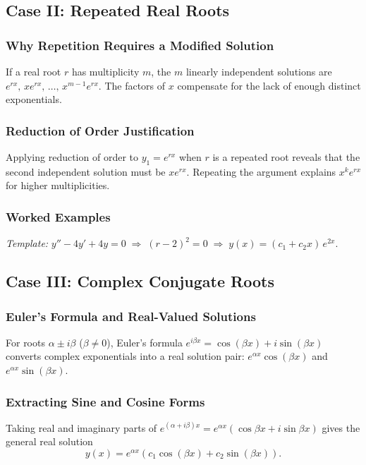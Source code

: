 \documentclass[10pt]{article}
\newcommand{\m}[1]{$#1$}
\newcommand{\annotspace}[1][3.5cm]{\vspace{#1}}
\begin{document}
    \annotspace[5cm]

\subsection{Case II: Repeated Real Roots}

    \subsubsection{Why Repetition Requires a Modified Solution}
    If a real root \m{r} has multiplicity \m{m}, the \m{m} linearly independent solutions are
    \m{e^{rx},\, x e^{rx},\, \ldots,\, x^{m-1} e^{rx}}.
    The factors of \m{x} compensate for the lack of enough distinct exponentials.

    \subsubsection{Reduction of Order Justification}
    Applying reduction of order to \m{y_1 = e^{rx}} when \m{r} is a repeated root reveals that the
    second independent solution must be \m{x e^{rx}}. Repeating the argument explains \m{x^k e^{rx}}
    for higher multiplicities.

    \subsubsection{Worked Examples}

    \textit{Template:} \quad
    \m{y'' - 4y' + 4y = 0 \;\Rightarrow\; (r-2)^2 = 0
    \;\Rightarrow\; y(x) = (c_1 + c_2 x)\,e^{2x}.}

    \annotspace[5cm]

\subsection{Case III: Complex Conjugate Roots}

    \subsubsection{Euler's Formula and Real-Valued Solutions}
    For roots \m{\alpha \pm i\beta} (\m{\beta \neq 0}), Euler's formula
    \m{e^{i\beta x} = \cos(\beta x) + i\sin(\beta x)} converts complex exponentials into a real
    solution pair: \m{e^{\alpha x}\cos(\beta x)} and \m{e^{\alpha x}\sin(\beta x)}.

    \subsubsection{Extracting Sine and Cosine Forms}
    Taking real and imaginary parts of
    \m{e^{(\alpha+i\beta)x} = e^{\alpha x}(\cos\beta x + i\sin\beta x)} gives the general real solution
    \[
        y(x) = e^{\alpha x}\!\left(c_1 \cos(\beta x) + c_2 \sin(\beta x)\right).
    \]
\end{document}
